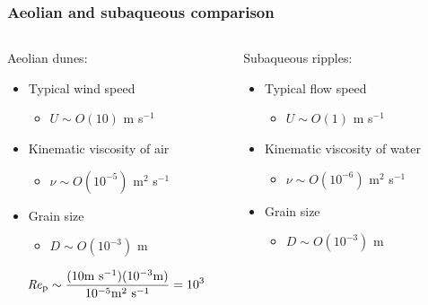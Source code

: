 \documentclass{beamer}
\newcommand\Rey{\mbox{\textit{Re}}}  %
\begin{document}
\begin{frame}
  \frametitle{Aeolian and subaqueous comparison}

  \vspace{-1cm}

  \begin{columns}[t]

    \begin{column}{0.5\textwidth}

      \centering

      Aeolian dunes:

      \begin{itemize}
      \item Typical wind speed 
        \begin{itemize}
        \item $U \sim O(10)$ m s$^{-1}$
        \end{itemize}
      \item Kinematic viscosity of air 
        \begin{itemize}
        \item $\nu \sim O(10^{-5})$ m$^{2}$ s$^{-1}$
        \end{itemize}
      \item Grain size 
        \begin{itemize}
        \item $D \sim O(10^{-3})$ m
        \end{itemize}
      \end{itemize}

      \begin{equation}
        \Rey_{\text{p}} \sim \frac{(10 \text{m s}^{-1})(10^{-3} \text{m})}{10^{-5} \text{m}^{2} \text{ s}^{-1}} = 10^{3} \nonumber
      \end{equation}

    \end{column}

    \begin{column}{0.5\textwidth}

      \centering

      Subaqueous ripples:

      \begin{itemize}
      \item Typical flow speed 
        \begin{itemize}
        \item $U \sim O(1)$ m s$^{-1}$
        \end{itemize}
      \item Kinematic viscosity of water 
        \begin{itemize}
        \item $\nu \sim O(10^{-6})$ m$^{2}$ s$^{-1}$
        \end{itemize}
      \item Grain size 
        \begin{itemize}
        \item $D \sim O(10^{-3})$ m
        \end{itemize}
      \end{itemize}


\end{column}
\end{columns}
\end{frame}
\end{document}
